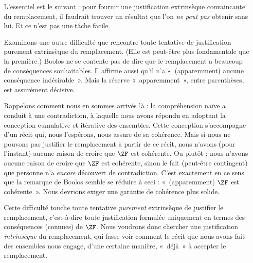\documentclass[../../../include/open-logic-section]{subfiles}
\begin{document}
L'essentiel est le suivant : pour fournir une justification
extrinsèque convaincante du remplacement, il faudrait trouver un
résultat que l'on \emph{ne peut pas} obtenir sans lui. Et ce n'est
pas une tâche facile.

Examinons une autre difficulté que rencontre toute tentative de
justification purement extrinsèque du remplacement. (Elle est
peut-être plus fondamentale que la première.) Boolos ne se contente
pas de dire que le remplacement a beaucoup de conséquences
souhaitables. Il affirme aussi qu'il n'a «~(apparemment) aucune
conséquence indésirable~». Mais la réserve «~apparemment~», entre
parenthèses, est assurément décisive.

Rappelons comment nous en sommes arrivés là : la compréhension
naïve a conduit à une contradiction, à laquelle nous avons répondu
en adoptant la conception cumulative et itérative des ensembles.
Cette conception s'accompagne d'un récit qui, nous l'espérons,
nous assure de sa cohérence. Mais si nous ne pouvons pas justifier
le remplacement à partir de ce récit, nous n'avons (pour l'instant)
aucune raison de croire que $\ZF$ est cohérente. Ou plutôt : nous
n'avons aucune raison de croire que $\ZF$ est cohérente, sinon le fait (peut-être
contingent) que personne n'a \emph{encore} découvert de contradiction.
C'est exactement en ce sens que la remarque de Boolos semble se
réduire à ceci : «~(apparemment) $\ZF$ est cohérente~». Nous devrions
exiger une garantie de cohérence plus solide.

Cette difficulté touche toute tentative \emph{purement} extrinsèque
de justifier le remplacement, c'est-à-dire toute justification
formulée uniquement en termes des conséquences (connues) de $\ZF$.
Nous voudrons donc chercher une justification \emph{intrinsèque}
du remplacement, qui fasse voir comment le récit que nous avons
fait des ensembles nous engage, d'une certaine manière, «~déjà~»
à accepter le remplacement.
\end{document}
